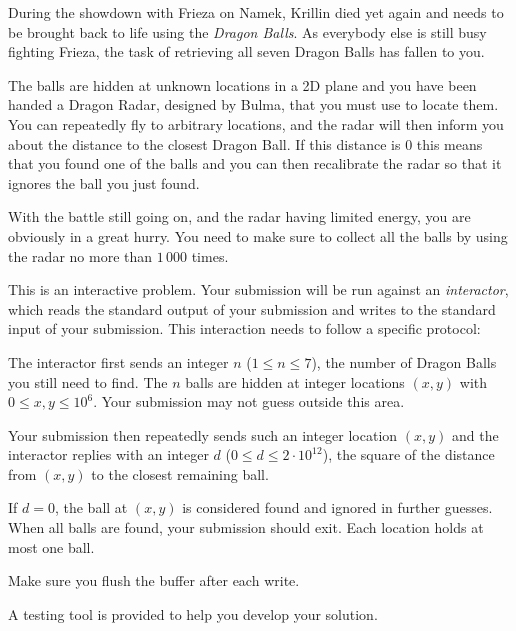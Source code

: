 
%
During the showdown with Frieza on Namek, Krillin died yet again and needs to
be brought back to life using the \emph{Dragon Balls}. As everybody else is
still busy fighting Frieza, the task of retrieving all seven Dragon Balls has
fallen to you.

The balls are hidden at unknown locations in a 2D plane and you have been
handed a Dragon Radar, designed by Bulma, that you must use to locate them.
You can repeatedly fly to arbitrary locations, and the radar
will then inform you about the distance to the closest Dragon Ball. If this
distance is $0$ this means that you found one of the balls and you can then
recalibrate the radar so that it ignores the ball you just found.

With the battle still going on, and the radar having limited energy, you
are obviously in a great hurry. You need to make sure to collect all the
balls by using the radar no more than $1\,000$ times.

\begin{Interaction}
This is an interactive problem. Your submission will be run against an
\emph{interactor}, which reads the standard output of your submission and
writes to the standard input of your submission. This interaction needs to
follow a specific protocol:

The interactor first sends an integer $n$ ($1 \le n \le 7$), the number of
Dragon Balls you still need to find. The $n$ balls are hidden at integer
locations $(x,y)$ with $0 \le x,y \le 10^6$. Your submission may not guess
outside this area.

Your submission then repeatedly sends such an integer location $(x,y)$ and the
interactor replies with an integer $d$ ($0 \le d \le 2\cdot 10^{12}$), the
square of the distance from $(x,y)$ to the closest remaining ball.

If $d = 0$, the ball at $(x,y)$ is considered found and ignored in further guesses.
When all balls are found,
your submission should exit. Each location holds at most one ball.

Make sure you flush the buffer after each write.

A testing tool is provided to help you develop your solution.
\end{Interaction}
